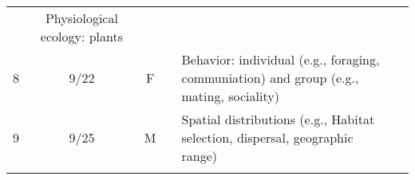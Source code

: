 \documentclass[]{article}
\begin{document}
\begin{longtable}[]{@{}ccclll@{}}
\begin{minipage}[t]{0.10\columnwidth}
\strut
\end{minipage} & \begin{minipage}[t]{0.12\columnwidth}\raggedright\strut
Physiological ecology: plants\strut
\end{minipage} & \begin{minipage}[t]{0.12\columnwidth}\raggedright\strut
\strut
\end{minipage}\tabularnewline
\begin{minipage}[t]{0.13\columnwidth}\centering\strut
8\strut
\end{minipage} & \begin{minipage}[t]{0.08\columnwidth}\centering\strut
9/22\strut
\end{minipage} & \begin{minipage}[t]{0.07\columnwidth}\centering\strut
F\strut
\end{minipage} & \begin{minipage}[t]{0.10\columnwidth}\raggedright\strut
\strut
\end{minipage} & \begin{minipage}[t]{0.12\columnwidth}\raggedright\strut
Behavior: individual (e.g., foraging, communiation) and group (e.g.,
mating, sociality)\strut
\end{minipage} & \begin{minipage}[t]{0.12\columnwidth}\raggedright\strut
\strut
\end{minipage}\tabularnewline
\begin{minipage}[t]{0.13\columnwidth}\centering\strut
9\strut
\end{minipage} & \begin{minipage}[t]{0.08\columnwidth}\centering\strut
9/25\strut
\end{minipage} & \begin{minipage}[t]{0.07\columnwidth}\centering\strut
M\strut
\end{minipage} & \begin{minipage}[t]{0.10\columnwidth}\raggedright\strut
\strut
\end{minipage} & \begin{minipage}[t]{0.12\columnwidth}\raggedright\strut
Spatial distributions (e.g., Habitat selection, dispersal, geographic
range)\strut
\end{minipage} & \begin{minipage}[t]{0.12\columnwidth}\raggedright\strut
\strut
\end{minipage}\tabularnewline
\begin{minipage}[t]{0.13\columnwidth}\centering\strut

\end{minipage}
\end{longtable}
\end{document}
